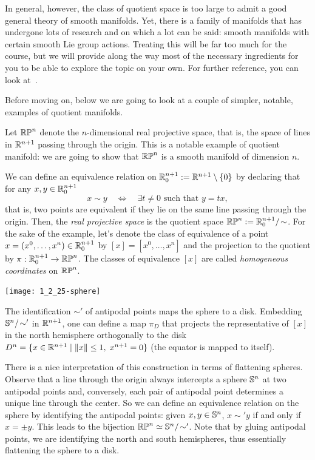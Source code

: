In general, however, the class of quotient space is too large to admit a good general theory of smooth manifolds.
Yet, there is a family of manifolds that has undergone lots of research and on which a lot can be said: smooth manifolds with certain smooth Lie group actions.
Treating this will be far too much for the course, but we will provide along the way most of the necessary ingredients for you to be able to explore the topic on your own.
For further reference, you can look at~\cite[Chapter 21]{book:lee}.

Before moving on, below we are going to look at a couple of simpler, notable, examples of quotient manifolds.

\begin{example}
  Let $\mathbb{RP}^n$ denote the $n$-dimensional real projective space, that is, the space of lines in $\mathbb{R}^{n+1}$ passing through the origin.
  This is a notable example of quotient manifold: we are going to show that $\mathbb{RP}^n$ is a smooth manifold of dimension $n$.

  We can define an equivalence relation on $\mathbb{R}^{n+1}_0:=\mathbb{R}^{n+1}\setminus\{0\}$ by declaring that for any $x,y\in \mathbb{R}^{n+1}_0$
  \begin{equation}
    x\sim y \quad\Longleftrightarrow\quad \exists t\neq 0 \mbox{ such that } y=tx,
  \end{equation}
  that is, two points are equivalent if they lie on the same line passing through the origin.
  Then, the \emph{real projective space} is the quotient space $\mathbb{RP}^n := \mathbb{R}^{n+1}_0/\!\sim$.
  For the sake of the example, let's denote the class of equivalence of a point $x=(x^0,\ldots,x^n)\in\mathbb{R}^{n+1}_0$ by $[x]=[x^0,\ldots,x^n]$ and the projection to the quotient by $\pi:\mathbb{R}^{n+1}_0\to\mathbb{RP}^n$.
  The classes of equivalence $[x]$ are called \emph{homogeneous coordinates} on $\mathbb{RP}^n$.

  \begin{marginfigure}
    \texttt{[image: 1\_2\_25-sphere]}
    \caption{The identification $\sim'$ of antipodal points maps the sphere to a disk. Embedding $\mathbb{S}^n/\!\sim'$ in $\mathbb{R}^{n+1}$, one can define a map $\pi_D$ that projects the representative of $[x]$ in the north hemisphere orthogonally to the disk $D^n = \{x\in\mathbb{R}^{n+1} \mid \|x\|\leq 1, \; x^{n+1}=0\}$ (the equator is mapped to itself). }
  \end{marginfigure}
  There is a nice interpretation of this construction in terms of flattening spheres.
  Observe that a line through the origin always intercepts a sphere $\mathbb{S}^n$ at two antipodal points and, conversely, each pair of antipodal point determines a unique line through the center.
  So we can define an equivalence relation on the sphere by identifying the antipodal points: given $x,y\in\mathbb{S}^n$, $x\sim' y$ if and only if $x = \pm y$.
  This leads to the bijection $\mathbb{RP}^n \simeq \mathbb{S}^n/\!\sim'$.
  Note that by gluing antipodal points, we are identifying the north and south hemispheres, thus essentially flattening the sphere to a disk.


\end{example}
